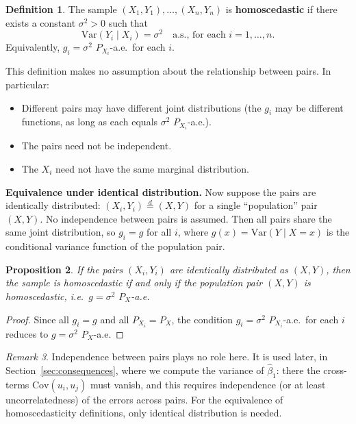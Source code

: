 \documentclass[a4paper,oneside,12pt]{extarticle}
\theoremstyle{plain}
\newtheorem{proposition}{Proposition}
\theoremstyle{definition}
\newtheorem{definition}[proposition]{Definition}
\theoremstyle{remark}
\newtheorem{remark}[proposition]{Remark}
\newcommand*{\Var}{\mathrm{Var}}
\begin{document}
\begin{definition}
The sample $(X_1,Y_1),\ldots,(X_n,Y_n)$ is \textbf{homoscedastic} if
there exists a constant $\sigma^2 > 0$ such that
\[
  \Var(Y_i \mid X_i) = \sigma^2 \quad \text{a.s., for each } i = 1,\ldots,n.
\]
Equivalently, $g_i = \sigma^2$ $P_{X_i}$-a.e.\ for each $i$.
\end{definition}

This definition makes no assumption about the relationship between pairs.
In particular:
\begin{itemize}
  \item Different pairs may have different joint distributions (the $g_i$
        may be different functions, as long as each equals $\sigma^2$
        $P_{X_i}$-a.e.).
  \item The pairs need not be independent.
  \item The $X_i$ need not have the same marginal distribution.
\end{itemize}

\textbf{Equivalence under identical distribution.}
Now suppose the pairs are identically distributed: $(X_i,Y_i)
\overset{d}{=} (X,Y)$ for a single ``population'' pair $(X,Y)$.
No independence between pairs is assumed. Then all pairs share
the same joint distribution, so $g_i = g$ for all $i$, where
$g(x) = \Var(Y \mid X = x)$ is the conditional variance function of the
population pair.

\begin{proposition}
If the pairs $(X_i,Y_i)$ are identically distributed as $(X,Y)$,
then the sample is homoscedastic if and only if the population pair
$(X,Y)$ is homoscedastic, i.e.\ $g = \sigma^2$ $P_X$-a.e.
\end{proposition}

\begin{proof}
Since all $g_i = g$ and all $P_{X_i} = P_X$, the condition
$g_i = \sigma^2$ $P_{X_i}$-a.e.\ for each $i$ reduces to $g = \sigma^2$
$P_X$-a.e.
\end{proof}

\begin{remark}
Independence between pairs plays no role here. It is used later, in
Section~\ref{sec:consequences}, where we compute the variance of
$\hat\beta_1$: there the cross-terms $\mathrm{Cov}(u_i, u_j)$ must vanish, and
this requires independence (or at least uncorrelatedness) of the errors
across pairs. For the equivalence of homoscedasticity definitions, only
identical distribution is needed.
\end{remark}
\end{document}
